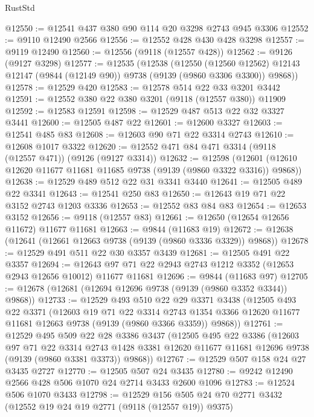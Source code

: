 \begin{lexlean}{RustStd}
\begin{coremodule}
@12550 := @12541 @437 @380 @90 @114 @20 @3298 @2743 @945 @3306
@12552 := @9110 @12490 @2566
@12556 := @12552 @428 @430 @428 @3298
@12557 := @9119 @12490
@12560 := @12556 (@9118 (@12557 @428))
@12562 := @9126 (@9127 @3298)
@12577 := @12535
    (@12538
      (@12550
        (@12560 @12562)
        @12143
        @12147
        (@9844 (@12149 @90))
        @9738
        (@9139 (@9860 @3306 @3300))
        @9868))
@12578 := @12529 @420
@12583 := @12578 @514 @22 @33 @3201 @3442
@12591 := @12552 @380 @22 @380 @3201 (@9118 (@12557 @380)) @11909
@12592 := @12583 @12591
@12598 := @12529 @487 @513 @22 @32 @3327 @3441
@12600 := @12505 @487 @22
@12601 := @12600 @3327
@12603 := @12541 @485 @83
@12608 := @12603 @90 @71 @22 @3314 @2743
@12610 := @12608 @1017 @3322
@12620 := @12552 @471 @84 @471 @3314 (@9118 (@12557 @471)) (@9126 (@9127 @3314))
@12632 := @12598
    (@12601 (@12610 @12620 @11677 @11681 @11685 @9738 (@9139 (@9860 @3322 @3316)) @9868))
@12638 := @12529 @489 @512 @22 @31 @3341 @3440
@12641 := @12505 @489 @22 @3341
@12643 := @12541 @250 @83
@12650 := @12643 @19 @71 @22 @3152 @2743 @1203 @3336
@12653 := @12552 @83 @84 @83
@12654 := @12653 @3152
@12656 := @9118 (@12557 @83)
@12661 := @12650 (@12654 @12656 @11672) @11677 @11681
@12663 := @9844 (@11683 @19)
@12672 := @12638 (@12641 (@12661 @12663 @9738 (@9139 (@9860 @3336 @3329)) @9868))
@12678 := @12529 @491 @511 @22 @30 @3357 @3439
@12681 := @12505 @491 @22 @3357
@12694 := @12643 @97 @71 @22 @2943 @2743 @1212 @3352 (@12653 @2943 @12656 @10012) @11677 @11681
@12696 := @9844 (@11683 @97)
@12705 := @12678 (@12681 (@12694 @12696 @9738 (@9139 (@9860 @3352 @3344)) @9868))
@12733 := @12529
    @493
    @510
    @22
    @29
    @3371
    @3438
    (@12505
      @493
      @22
      @3371
      (@12603
        @19
        @71
        @22
        @3314
        @2743
        @1354
        @3366
        @12620
        @11677
        @11681
        @12663
        @9738
        (@9139 (@9860 @3366 @3359))
        @9868))
@12761 := @12529
    @495
    @509
    @22
    @28
    @3386
    @3437
    (@12505
      @495
      @22
      @3386
      (@12603
        @97
        @71
        @22
        @3314
        @2743
        @1428
        @3381
        @12620
        @11677
        @11681
        @12696
        @9738
        (@9139 (@9860 @3381 @3373))
        @9868))
@12767 := @12529 @507 @158 @24 @27 @3435 @2727
@12770 := @12505 @507 @24 @3435
@12780 := @9242 @12490 @2566 @428 @506 @1070 @24 @2714 @3433 @2600 @1096
@12783 := @12524 @506 @1070 @3433
@12798 := @12529 @156 @505 @24 @70 @2771 @3432 (@12552 @19 @24 @19 @2771 (@9118 (@12557 @19)) @9375)

\end{coremodule}
\end{lexlean}

